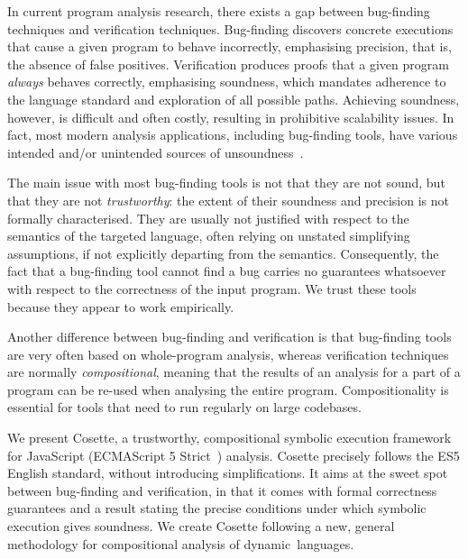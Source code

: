 \documentclass[sigconf, anonymous, review]{acmart}
\newcommand{\jsil}{JSIL\xspace}
\newcommand{\polish}[1]{{\color{red}#1}}
\newcommand{\cosette}{Cosette\xspace}
\begin{document}
In current program analysis research, there exists a gap between bug-finding techniques and verification techniques. Bug-finding discovers concrete executions that cause a given program to behave incorrectly, emphasising precision, that is, the absence of false positives. Verification produces proofs that a given program \emph{always} behaves correctly, emphasising soundness, which mandates adherence to the language standard and  exploration of all possible paths.
%
Achieving soundness, however, is difficult and often costly, resulting in prohibitive scalability issues. In fact, most modern analysis applications, including bug-finding tools, have various intended and/or unintended sources of unsoundness~\cite{soundyPaper}.
%

The main issue with most bug-finding tools is not that they are not sound, but that they are not \emph{trustworthy}: the extent of their soundness and precision is not formally characterised. They are usually not justified with respect to the semantics of the targeted language, often relying on unstated simplifying assumptions, if not explicitly departing from the semantics. Consequently, the fact that a bug-finding tool cannot find a bug carries no guarantees whatsoever with respect to the correctness of the input program. We trust these tools because they appear to work empirically. 

Another difference between bug-finding and verification is that bug-finding tools are very often based on whole-program analysis, whereas verification techniques are normally \emph{compositional}, meaning that the results of an analysis for a part of a program can be re-used when analysing the entire program. Compositionality is essential for tools that need to run regularly on large codebases. %



We present \cosette, a trustworthy, compositional symbolic execution framework for JavaScript (ECMAScript 5 Strict~\cite{ecma}) analysis. \cosette precisely follows the ES5 English standard, without introducing simplifications. 
It aims at the sweet spot between bug-finding and verification, 
in that it comes with formal correctness guarantees and a \polish{result stating the precise conditions under which symbolic execution gives soundness}. We create \cosette following a new, general methodology for compositional analysis of dynamic~languages.
\end{document}

